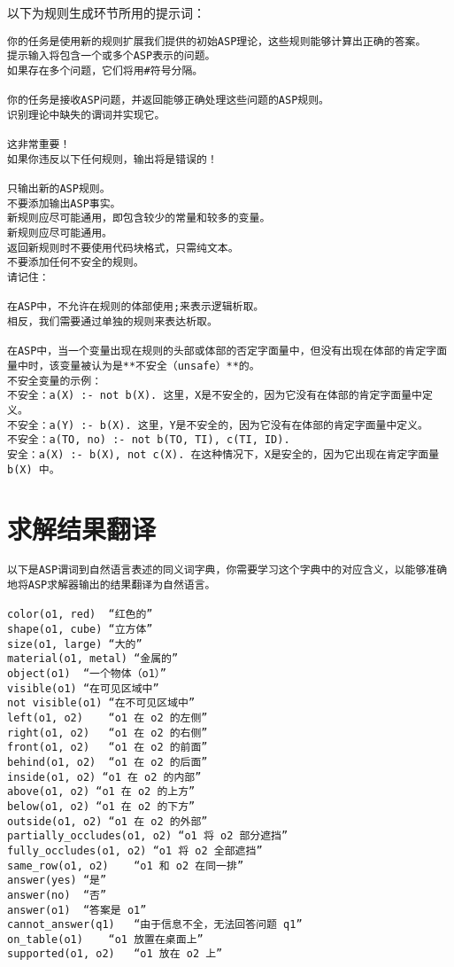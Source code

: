 以下为规则生成环节所用的提示词：
\begin{lstlisting}
你的任务是使用新的规则扩展我们提供的初始ASP理论，这些规则能够计算出正确的答案。
提示输入将包含一个或多个ASP表示的问题。
如果存在多个问题，它们将用#符号分隔。

你的任务是接收ASP问题，并返回能够正确处理这些问题的ASP规则。
识别理论中缺失的谓词并实现它。

这非常重要！
如果你违反以下任何规则，输出将是错误的！

只输出新的ASP规则。
不要添加输出ASP事实。
新规则应尽可能通用，即包含较少的常量和较多的变量。
新规则应尽可能通用。
返回新规则时不要使用代码块格式，只需纯文本。
不要添加任何不安全的规则。
请记住：

在ASP中，不允许在规则的体部使用;来表示逻辑析取。
相反，我们需要通过单独的规则来表达析取。

在ASP中，当一个变量出现在规则的头部或体部的否定字面量中，但没有出现在体部的肯定字面量中时，该变量被认为是**不安全（unsafe）**的。
不安全变量的示例：
不安全：a(X) :- not b(X). 这里，X是不安全的，因为它没有在体部的肯定字面量中定义。
不安全：a(Y) :- b(X). 这里，Y是不安全的，因为它没有在体部的肯定字面量中定义。
不安全：a(TO, no) :- not b(TO, TI), c(TI, ID).
安全：a(X) :- b(X), not c(X). 在这种情况下，X是安全的，因为它出现在肯定字面量 b(X) 中。
\end{lstlisting}
\section{求解结果翻译}
\label{appendix:result-translate}
\begin{lstlisting}
以下是ASP谓词到自然语言表述的同义词字典，你需要学习这个字典中的对应含义，以能够准确地将ASP求解器输出的结果翻译为自然语言。

color(o1, red)	“红色的”
shape(o1, cube)	“立方体”
size(o1, large)	“大的”
material(o1, metal)	“金属的”
object(o1)	“一个物体（o1）”
visible(o1)	“在可见区域中”
not visible(o1)	“在不可见区域中”
left(o1, o2)	“o1 在 o2 的左侧”
right(o1, o2)	“o1 在 o2 的右侧”
front(o1, o2)	“o1 在 o2 的前面”
behind(o1, o2)	“o1 在 o2 的后面”
inside(o1, o2) “o1 在 o2 的内部”
above(o1, o2) “o1 在 o2 的上方”
below(o1, o2) “o1 在 o2 的下方”
outside(o1, o2) “o1 在 o2 的外部”
partially_occludes(o1, o2) “o1 将 o2 部分遮挡”
fully_occludes(o1, o2) “o1 将 o2 全部遮挡”
same_row(o1, o2)	“o1 和 o2 在同一排”
answer(yes)	“是”
answer(no)	“否”
answer(o1)	“答案是 o1”
cannot_answer(q1)	“由于信息不全，无法回答问题 q1”
on_table(o1)	“o1 放置在桌面上”
supported(o1, o2)	“o1 放在 o2 上”
\end{lstlisting}